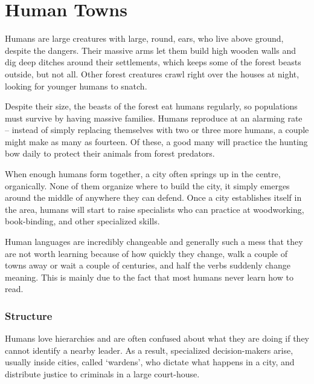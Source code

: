 \section[Humans]{Human Towns \Hu}
\label{humanTowns}

\begin{multicols}{2}
\renewcommand\npcsymbol{\Hu}


\noindent
Humans are large creatures with large, round, ears, who live above ground, despite the dangers.
Their massive arms let them build high wooden walls and dig deep ditches around their settlements, which keeps some of the forest beasts outside, but not all.
Other forest creatures crawl right over the houses at night, looking for younger humans to snatch.

Despite their size, the beasts of the forest eat humans regularly, so populations must survive by having massive families.
Humans reproduce at an alarming rate -- instead of simply replacing themselves with two or three more humans, a couple might make as many as fourteen.
Of these, a good many will practice the hunting bow daily to protect their animals from forest predators.

When enough humans form  together, a city often springs up in the centre, organically.
None of them organize where to build the city, it simply emerges around the middle of anywhere they can defend.
Once a city establishes itself in the area, humans will start to raise specialists who can practice at woodworking, book-binding, and other specialized skills.

Human languages are incredibly changeable and generally such a mess that they are not worth learning because of how quickly they change, walk a couple of towns away or wait a couple of centuries, and half the verbs suddenly change meaning.
This is mainly due to the fact that most humans never learn how to read.

\subsubsection{Structure}

Humans love hierarchies and are often confused about what they are doing if they cannot identify a nearby leader.
As a result, specialized decision-makers arise, usually inside cities, called `\glspl{warden}', who dictate what happens in a city, and distribute justice to criminals in a large court-house.


\end{multicols}
